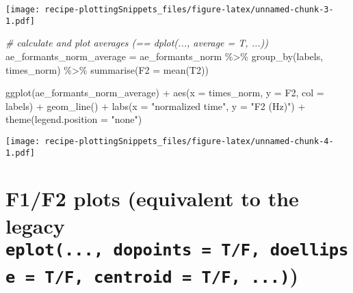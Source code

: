 \documentclass[
]{book}
\newenvironment{Shaded}{\begin{snugshade}}{\end{snugshade}}
\newcommand{\AttributeTok}[1]{\textcolor[rgb]{0.77,0.63,0.00}{#1}}
\newcommand{\CommentTok}[1]{\textcolor[rgb]{0.56,0.35,0.01}{\textit{#1}}}
\newcommand{\FunctionTok}[1]{\textcolor[rgb]{0.00,0.00,0.00}{#1}}
\newcommand{\NormalTok}[1]{#1}
\newcommand{\OtherTok}[1]{\textcolor[rgb]{0.56,0.35,0.01}{#1}}
\newcommand{\SpecialCharTok}[1]{\textcolor[rgb]{0.00,0.00,0.00}{#1}}
\newcommand{\StringTok}[1]{\textcolor[rgb]{0.31,0.60,0.02}{#1}}
\begin{document}
\texttt{[image: recipe-plottingSnippets\_files/figure-latex/unnamed-chunk-3-1.pdf]}

\begin{Shaded}
\begin{Highlighting}[]
\CommentTok{\# calculate and plot averages (== dplot(..., average = T, ...))}
\NormalTok{ae\_formants\_norm\_average }\OtherTok{=}\NormalTok{ ae\_formants\_norm }\SpecialCharTok{\%\textgreater{}\%} 
  \FunctionTok{group\_by}\NormalTok{(labels, times\_norm) }\SpecialCharTok{\%\textgreater{}\%}
  \FunctionTok{summarise}\NormalTok{(}\AttributeTok{F2 =} \FunctionTok{mean}\NormalTok{(T2))}

\FunctionTok{ggplot}\NormalTok{(ae\_formants\_norm\_average) }\SpecialCharTok{+}
  \FunctionTok{aes}\NormalTok{(}\AttributeTok{x =}\NormalTok{ times\_norm, }\AttributeTok{y =}\NormalTok{ F2, }\AttributeTok{col =}\NormalTok{ labels) }\SpecialCharTok{+}
  \FunctionTok{geom\_line}\NormalTok{() }\SpecialCharTok{+}
  \FunctionTok{labs}\NormalTok{(}\AttributeTok{x =} \StringTok{"normalized time"}\NormalTok{, }\AttributeTok{y =} \StringTok{"F2 (Hz)"}\NormalTok{) }\SpecialCharTok{+}
  \FunctionTok{theme}\NormalTok{(}\AttributeTok{legend.position =} \StringTok{"none"}\NormalTok{)}
\end{Highlighting}
\end{Shaded}

\texttt{[image: recipe-plottingSnippets\_files/figure-latex/unnamed-chunk-4-1.pdf]}

\hypertarget{f1f2-plots-equivalent-to-the-legacy-eplot...-dopoints-tf-doellipse-tf-centroid-tf-...}{%
\section{\texorpdfstring{F1/F2 plots (equivalent to the legacy \texttt{eplot(...,\ dopoints\ =\ T/F,\ doellipse\ =\ T/F,\ centroid\ =\ T/F,\ ...)})}{F1/F2 plots (equivalent to the legacy eplot(..., dopoints = T/F, doellipse = T/F, centroid = T/F, ...))}}\label{f1f2-plots-equivalent-to-the-legacy-eplot...-dopoints-tf-doellipse-tf-centroid-tf-...}}
\end{document}
